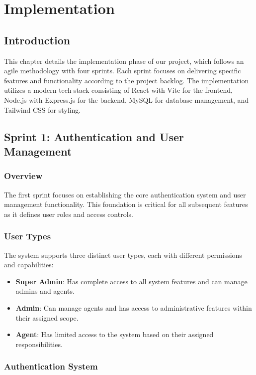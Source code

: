 \chapter{Implementation}

\section{Introduction}
This chapter details the implementation phase of our project, which follows an agile methodology with four sprints. Each sprint focuses on delivering specific features and functionality according to the project backlog. The implementation utilizes a modern tech stack consisting of React \cite{ReactWebsite} with Vite \cite{ViteJSWebsite} for the frontend, Node.js \cite{NodeJSWebsite} with Express.js \cite{ExpressJSWebsite} for the backend, MySQL \cite{MySQLWebsite} for database management, and Tailwind CSS \cite{TailwindWebsite} for styling.

\section{Sprint 1: Authentication and User Management}
\subsection{Overview}
The first sprint focuses on establishing the core authentication system and user management functionality. This foundation is critical for all subsequent features as it defines user roles and access controls.

\subsection{User Types}
The system supports three distinct user types, each with different permissions and capabilities:
\begin{itemize}
    \item \textbf{Super Admin}: Has complete access to all system features and can manage admins and agents.
    \item \textbf{Admin}: Can manage agents and has access to administrative features within their assigned scope.
    \item \textbf{Agent}: Has limited access to the system based on their assigned responsibilities.
\end{itemize}

\subsection{Authentication System}

